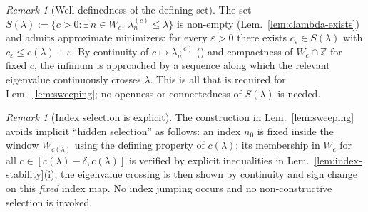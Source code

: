 \documentclass[12pt,a4paper]{amsart}
\theoremstyle{definition}
\theoremstyle{remark}
\newtheorem{remark}[theorem]{Remark}
\begin{document}
\begin{remark}[Well-definedness of the defining set]
\label{rem:clambda-welldef}
The set
$S(\lambda) := \{c > 0 : \exists\, n\in W_c,\,
\lambda_n^{(c)} \le \lambda\}$
is non-empty (Lem.~\ref{lem:clambda-exists})
and admits approximate minimizers:
for every $\varepsilon > 0$ there exists
$c_\varepsilon \in S(\lambda)$ with
$c_\varepsilon \le c(\lambda) + \varepsilon$.
By continuity of $c \mapsto \lambda_n^{(c)}$
(\cite{Kato1966}) and compactness of
$W_c \cap \mathbb{Z}$ for fixed $c$,
the infimum is approached by a sequence
along which the relevant eigenvalue
continuously crosses $\lambda$.
This is all that is required for
Lem.~\ref{lem:sweeping}; no openness or
connectedness of $S(\lambda)$ is needed.
\end{remark}

\begin{remark}[Index selection is explicit]
\label{rem:index-selection}
The construction in Lem.~\ref{lem:sweeping}
avoids implicit ``hidden selection'' as follows:
an index $n_0$ is fixed inside the window
$W_{c(\lambda)}$ using the defining property
of $c(\lambda)$; its membership in $W_c$
for all $c\in[c(\lambda)-\delta,c(\lambda)]$
is verified by explicit inequalities
in Lem.~\ref{lem:index-stability}(i);
the eigenvalue crossing is then shown by
continuity and sign change on this
\emph{fixed} index map.
No index jumping occurs and no
non-constructive selection is invoked.
\end{remark}
\end{document}
